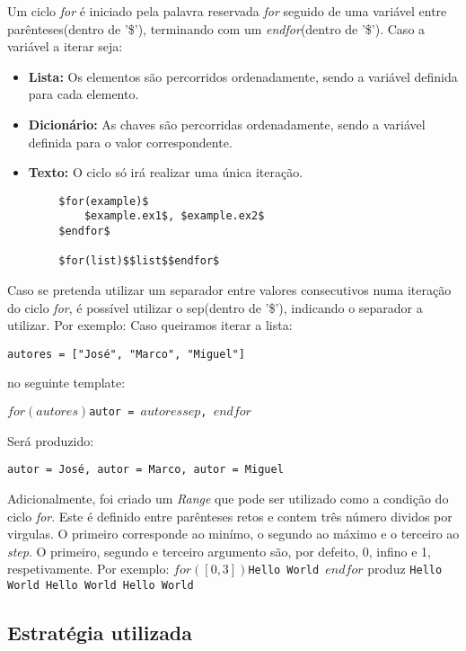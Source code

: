 \documentclass[../relatorio.tex]{subfiles}
\begin{document}
    Um ciclo \textit{for} é iniciado pela palavra reservada \textit{for}
    seguido de uma variável entre parênteses(dentro de '\$'), terminando 
    com um \textit{endfor}(dentro de '\$').
    Caso a variável a iterar seja:
    \begin{itemize}
        \item \textbf{Lista: }Os elementos são percorridos ordenadamente,
        sendo a variável definida para cada elemento.
        \item \textbf{Dicionário: }As chaves são percorridas ordenadamente,
        sendo a variável definida para o valor correspondente. 
        \item \textbf{Texto: }O ciclo só irá realizar uma única iteração.
    \end{itemize}

    \begin{verbatim}
        $for(example)$
            $example.ex1$, $example.ex2$
        $endfor$

        $for(list)$$list$$endfor$
    \end{verbatim}

    Caso se pretenda utilizar um separador entre valores consecutivos numa
    iteração do ciclo \textit{for}, é possível utilizar o sep(dentro de '\$'),
    indicando o separador a utilizar. Por exemplo:
    Caso queiramos iterar a lista:

    \texttt{autores = ["José", "Marco", "Miguel"]}

    no seguinte template:

    \texttt{$for(autores)$autor = $autores$$sep$, $endfor$}

    Será produzido:

    \texttt{autor = José, autor = Marco, autor = Miguel}

    Adicionalmente, foi criado um \textit{Range} que pode ser utilizado como a
    condição do ciclo \textit{for}. Este é definido entre parênteses retos e 
    contem três número dividos por virgulas. O primeiro corresponde ao minímo, o segundo
    ao máximo e o terceiro ao \textit{step}. O primeiro, segundo e terceiro argumento são,
    por defeito, 0, infino e 1, respetivamente.
    Por exemplo:
    \texttt{$for([0, 3])$Hello World $endfor$}
    produz
    \texttt{Hello World Hello World Hello World }

    \subsection*{Estratégia utilizada}
\end{document}
